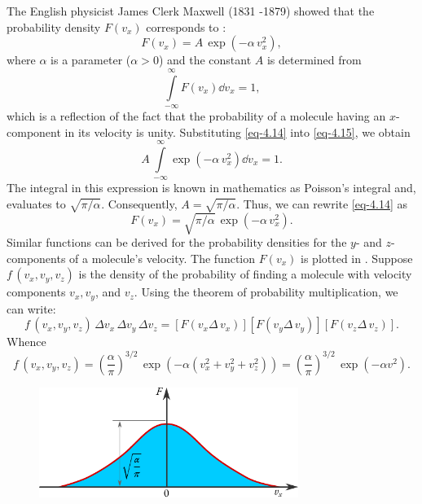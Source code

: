 The English physicist James Clerk Maxwell (1831 -1879) showed that
the	probability	density	 $F  (v_{x})$ corresponds	to :
\begin{equation}%
F (v_{x}) = A \, \exp (- \alpha \, v_{x}^{2}),
\label{eq-4.14}
\end{equation}
where $\alpha$ is a parameter ($\alpha > 0$) and the constant $A$ is determined from
\begin{equation}%
\int\limits_{- \infty}^{\infty} F (v_{x}) \dd v_{x} = 1,
\label{eq-4.15}
\end{equation}
which is a reflection of the fact that the probability of a molecule having
an $x$-component in its velocity is unity. Substituting \eqref{eq-4.14} into \eqref{eq-4.15}, we obtain
\begin{equation*}%
A \, \int\limits_{- \infty}^{\infty} \exp (- \alpha \, v_{x}^{2}) \dd v_{x} = 1.
\label{gauss-law-param}
\end{equation*}
The integral in this expression is known in mathematics as Poisson's integral and, evaluates to $\sqrt{\pi / \alpha}$. Consequently, $ A = \sqrt{\pi / \alpha}$. Thus, we can rewrite \eqref{eq-4.14} as 
\begin{equation}%
F (v_{x})  = \sqrt{\pi / \alpha} \, \exp (- \alpha \, v_{x}^{2}).
\label{eq-4.16}
\end{equation}
Similar functions can be derived for the probability densities for the $y$- and $z$-components of a molecule's velocity. The function $F(v_{x} )$ is plotted in . Suppose $f \,(v_{x}, v_{y}, v_{z})$ is the density of the probability of finding a molecule with velocity components $v_{x}, v_{y}$, and $v_{z}$. Using the theorem of probability multiplication, we can write:
\begin{equation*}%
f \, (v_{x}, v_{y}, v_{z}) \, \Delta v_{x}\, \Delta  v_{y} \, \Delta v_{z} = [F(v_{x} \Delta \, v_{x})] [F(v_{y} \Delta \, v_{y})][F(v_{z} \Delta \, v_{z})].
\end{equation*}
Whence
\begin{equation}
f \, (v_{x}, v_{y}, v_{z}) = \left(\frac{\alpha}{\pi} \right) ^{3/2} \, \exp (- \alpha (v_{x}^{2}+ v_{y}^{2} + v_{z}^{2})) = \left(\frac{\alpha}{\pi} \right) ^{3/2} \, \exp(- \alpha v^{2}).
\label{eq-4.17}
\end{equation}

\begin{figure}[!ht]
\centering
\includegraphics[width=0.75\textwidth]{figures/maxwl-dist1.pdf}
\end{figure}



